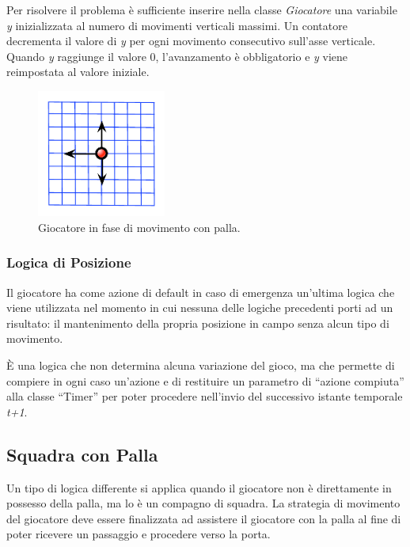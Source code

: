 \documentclass[aps,letterpaper,10pt]{article}
\begin{document}
Per risolvere il problema \`e sufficiente inserire nella classe \emph{Giocatore} una variabile \emph{y} inizializzata al
numero di movimenti verticali massimi. Un contatore decrementa il valore di \emph{y} per ogni movimento consecutivo
sull'asse verticale. Quando \emph{y} raggiunge il valore 0, l'avanzamento \`e obbligatorio e \emph{y} viene reimpostata
al valore iniziale.

\begin{figure}[H]
	\begin{center}
		\includegraphics[width=160px]{images/vision4.pdf}
	\end{center}
\caption{Giocatore in fase di movimento con palla.}
\end{figure}

\subsubsection{Logica di Posizione}
\label{posizione}

Il giocatore ha come azione di default in caso di emergenza un'ultima logica che viene utilizzata nel momento in cui
nessuna delle logiche precedenti porti ad un risultato: il mantenimento della propria posizione in campo senza alcun
tipo di movimento. \vspace{3mm}

\`E una logica che non determina alcuna variazione del gioco, ma che permette di compiere in ogni caso un'azione e di
restituire un parametro di ``azione compiuta'' alla classe ``Timer'' per poter procedere nell'invio del successivo
istante temporale \emph{t+1}.

\subsection{Squadra con Palla}

Un tipo di logica differente si applica quando il giocatore non \`e direttamente in possesso della palla, ma lo \`e un
compagno di squadra. La strategia di movimento del giocatore deve essere finalizzata ad assistere il giocatore con la
palla al fine di poter ricevere un passaggio e procedere verso la porta.
\end{document}
